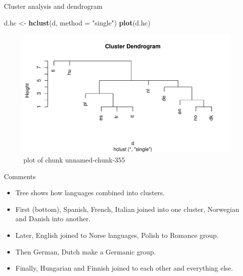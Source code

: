 \documentclass[ignorenonframetext,]{beamer}
\newenvironment{Shaded}{\begin{snugshade}}{\end{snugshade}}
\newcommand{\DataTypeTok}[1]{\textcolor[rgb]{0.13,0.29,0.53}{#1}}
\newcommand{\KeywordTok}[1]{\textcolor[rgb]{0.13,0.29,0.53}{\textbf{#1}}}
\newcommand{\NormalTok}[1]{#1}
\newcommand{\StringTok}[1]{\textcolor[rgb]{0.31,0.60,0.02}{#1}}
\begin{document}
\begin{frame}[fragile]{Cluster analysis and dendrogram}
\protect\hypertarget{cluster-analysis-and-dendrogram}{}

\begin{Shaded}
\begin{Highlighting}[]
\NormalTok{d.hc <-}\StringTok{ }\KeywordTok{hclust}\NormalTok{(d, }\DataTypeTok{method =} \StringTok{"single"}\NormalTok{)}
\KeywordTok{plot}\NormalTok{(d.hc)}
\end{Highlighting}
\end{Shaded}

\begin{figure}
\centering
\includegraphics{figure/unnamed-chunk-355-1.pdf}
\caption{plot of chunk unnamed-chunk-355}
\end{figure}

\end{frame}

\begin{frame}{Comments}
\protect\hypertarget{comments-24}{}

\begin{itemize}
\item
  Tree shows how languages combined into clusters.
\item
  First (bottom), Spanish, French, Italian joined into one cluster,
  Norwegian and Danish into another.
\item
  Later, English joined to Norse languages, Polish to Romance group.
\item
  Then German, Dutch make a Germanic group.
\item
  Finally, Hungarian and Finnish joined to each other and everything
  else.
\end{itemize}

\end{frame}
\end{document}
